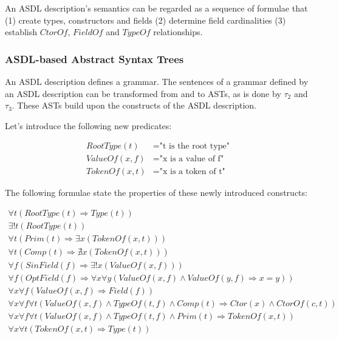 \documentclass[12pt]{article}
\begin{document}
\noindent
An ASDL description's semantics can be regarded as a sequence of formulae that (1) create types, constructors and fields (2) determine field cardinalities (3) establish $CtorOf$, $FieldOf$ and $TypeOf$ relationships.

\subsubsection{ASDL-based Abstract Syntax Trees}

An ASDL description defines a grammar. The sentences of a grammar defined by an ASDL description can be transformed from and to ASTs, as is done by $\tau_{2}$ and $\tau_{3}$. These ASTs build upon the constructs of the ASDL description.

\noindent
Let's introduce the following new predicates:

\vspace{-.5cm}
\begin{align*}
RootType(t) &= \text{"t is the root type"} \\
ValueOf(x, f) &= \text{"x is a value of f"} \\
TokenOf(x, t) &= \text{"x is a token of t"}
\end{align*}

\noindent
The following formulae state the properties of these newly introduced constructs:

\begingroup
\allowdisplaybreaks
\vspace{-.5cm}
\begin{gather*}
\forall t(RootType(t) \Rightarrow Type(t)) \\
\exists! t(RootType(t)) \\
\forall t(Prim(t) \Rightarrow \exists x(TokenOf(x, t))) \\
\forall t(Comp(t) \Rightarrow \nexists x(TokenOf(x, t))) \\
\forall f(SinField(f) \Rightarrow \exists! x(ValueOf(x, f))) \\
\forall f(OptField(f) \Rightarrow \forall x \forall y(ValueOf(x, f) \land ValueOf(y, f) \Rightarrow x = y)) \\
\forall x \forall f(ValueOf(x, f) \Rightarrow Field(f)) \\
\forall x \forall f \forall t(ValueOf(x, f) \land TypeOf(t, f) \land Comp(t) \Rightarrow Ctor(x) \land CtorOf(c, t)) \\
\forall x \forall f \forall t(ValueOf(x, f) \land TypeOf(t, f) \land Prim(t) \Rightarrow TokenOf(x, t)) \\
\forall x \forall t(TokenOf(x, t) \Rightarrow Type(t))
\end{gather*}
\endgroup
\end{document}
